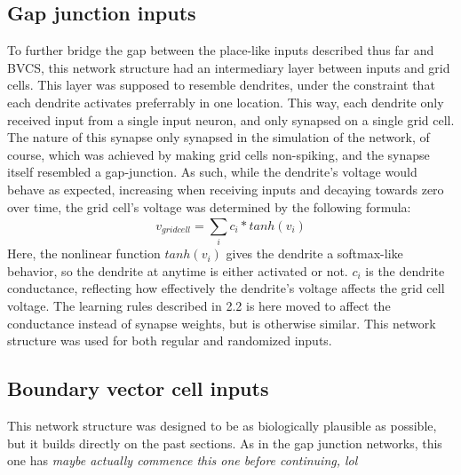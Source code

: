 \documentclass{article}
\begin{document}
    \subsection{Gap junction inputs}
    To further bridge the gap between the place-like inputs described thus far and BVCS, this network structure had an intermediary layer between inputs and grid cells. This layer was supposed to resemble dendrites, under the constraint that each dendrite activates preferrably in one location. This way, each dendrite only received input from a single input neuron, and only synapsed on a single grid cell. The nature of this synapse only synapsed in the simulation of the network, of course, which was achieved by making grid cells non-spiking, and the synapse itself resembled a gap-junction.
    As such, while the dendrite's voltage would behave as expected, increasing when receiving inputs and decaying towards zero over time, the grid cell's voltage was determined by the following formula: \[ v_{grid cell} = \sum_{i}^{} c_i * tanh(v_i)\] Here, the nonlinear function \(tanh(v_i)\) gives the dendrite a softmax-like behavior, so the dendrite at anytime is either activated or not. \(c_i\) is the dendrite conductance, reflecting how effectively the dendrite's voltage affects the grid cell voltage. The learning rules described in 2.2 is here moved to affect the conductance instead of synapse weights, but is otherwise similar.
    This network structure was used for both regular and randomized inputs.

    \subsection{Boundary vector cell inputs}
    This network structure was designed to be as biologically plausible as possible, but it builds directly on the past sections. As in the gap junction networks, this one has \textit{maybe actually commence this one before continuing, lol}


{}

\end{document}
